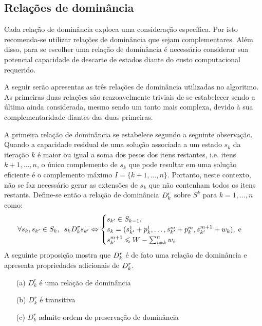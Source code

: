 

\subsection{Relações de dominância}
\label{sec:reldom}

Cada relação de dominância exploca uma consideração específica.
Por isto recomenda-se utilizar relações de dominância que sejam complementares.
Além disso, para se escolher uma relação de dominância é necessário considerar
sua potencial capacidade de descarte de estados diante do
custo computacional requerido.

A seguir serão apresentas as três relações de dominância utilizadas no algoritmo.
As primeiras duas relações são reazoavelmente triviais de se estabelecer sendo
a última ainda considerada, mesmo sendo um tanto mais complexa, devido à sua
complementaridade diantes das duas primeiras.

A primeira relação de dominância se estabelece segundo a seguinte observação.
Quando a capacidade residual de uma solução associada a um estado $s_k$
da iteração $k$ é maior ou igual a soma dos pesos dos itens restantes,
i.e. itens $k+1, \ldots, n$, o único complemento de $s_k$ que pode resultar
em uma solução eficiente é o complemento máximo $I = \{k+1, \ldots, n\}$.
Portanto, neste contexto, não se faz necessário gerar as extensões de $s_k$
que não contenham todos os itens restants.
Define-se então a relação de dominância $D_k^r$ sobre $S^k$ para
$k = 1, \ldots, n$ como:
\begin{displaymath}
  \forall s_k, s_{{k'}} \in S_k, \enskip
  s_k D_k^r s_{{k'}}
    \Leftrightarrow
    \begin{cases}
      s_{{k'}} \in S_{k-1}, \\
      s_k = (s_{{k'}}^1 + p_k^1, \ldots, s_{{k'}}^m + p_k^m, s_{{k'}}^{m+1} + w_k), \; \text{e} \\
      s_{{k'}}^{m+1} \leqslant W - \sum_{i=k}^n w_i
    \end{cases}
\end{displaymath}
A seguinte proposição mostra que $D_k^r$ é de fato uma relação de dominância
e apresenta propriedades adicionais de $D_k^r$.

\begin{myprop}[Relação $D_k^r$]
  \noindent
  \begin{enumerate}
    \item[(a)] $D_k^r$ é uma relação de dominância
    \item[(b)] $D_k^r$ é transitiva
    \item[(c)] $D_k^r$ admite ordem de preservação de dominância
\end{enumerate}
\end{myprop}

